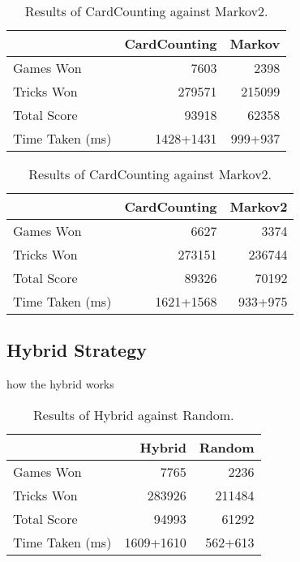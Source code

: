 \begin{table}[ht]
    \begin{minipage}{.525\linewidth}
        \centering
        \begin{tabular}{l|rr}
            ~               &  CardCounting &   Markov  \\  \hline
            Games Won       &   7603        &   2398   \\
            Tricks Won      &   279571      &   215099 \\
            Total Score     &   93918      &   62358  \\
            Time Taken (ms) &   1428+1431   &   999+937
        \end{tabular}
        \caption{Results of CardCounting against Markov.}
        \label{tab:cardcounting_markov}
    \end{minipage}%
    \begin{minipage}{.525\linewidth}
        \centering
        \begin{tabular}{l|rr}
            ~               &  CardCounting &   Markov2  \\  \hline
            Games Won       &   6627        &   3374   \\
            Tricks Won      &   273151      &   236744 \\
            Total Score     &   89326      &   70192  \\
            Time Taken (ms) &   1621+1568   &   933+975
        \end{tabular}
        \caption{Results of CardCounting against Markov2.}
        \label{tab:cardcounting_markov2}
    \end{minipage} 
\end{table}



\subsection{Hybrid Strategy}

how the hybrid works


\begin{table}[ht]
    \centering
    \begin{tabular}{l|rr}
        ~               &  Hybrid &   Random  \\  \hline
        Games Won       &   7765        &   2236   \\
        Tricks Won      &   283926      &   211484 \\
        Total Score     &   94993      &   61292  \\
        Time Taken (ms) &   1609+1610   &   562+613
    \end{tabular}
    \caption{Results of Hybrid against Random.}
    \label{tab:hybrid_random}
\end{table}

